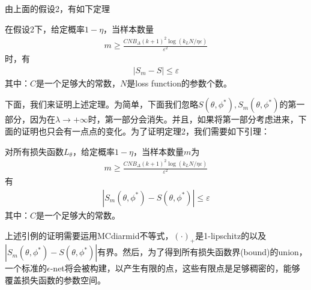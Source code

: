             \par
            由上面的假设2，有如下定理
            \begin{theorem}[2]
            在假设2下，给定概率$1-\eta$，当样本数量
            \begin{align*}
            m \geqslant \frac{CNB_\Delta(k+1)^2 \log(k_LN/\eta\varepsilon)}{\varepsilon^2}
            \end{align*}
            时，有
            \begin{align*}
            |S_m - S| \leqslant \varepsilon
            \end{align*}
            其中：$C$是一个足够大的常数，$N$是loss function的参数个数。
            \end{theorem}
            \par
            下面，我们来证明上述定理。为简单，下面我们忽略$S(\theta,\phi^*),S_m(\theta,\phi^*)$的第一部分，因为在$\lambda\to +\infty$时，第一部分会消失。并且，如果将第一部分考虑进来，下面的证明也只会有一点点的变化。为了证明定理2，我们需要如下引理：
            \begin{lemma}[6]
            \label{LS-GAN：引理6}
            对所有损失函数$L_\theta$，给定概率$1-\eta$，当样本数量$m$为
            \begin{align*}
            m \geqslant \frac{CNB_\Delta(k+1)^2 \log(k_LN/\eta\varepsilon)}{\varepsilon^2}
            \end{align*}
            有
            \begin{align*}
            |S_m(\theta,\phi^*) - S(\theta,\phi^*)| \leqslant \varepsilon
            \end{align*}
            其中：$C$是一个足够大的常数。
            \end{lemma}
            \par
            上述引例的证明需要运用MCdiarmid不等式，$(\cdot)_+$是1-lipschitz的以及$|S_m(\theta,\phi^*) - S(\theta,\phi^*)|$有界。然后，为了得到所有损失函数界(bound)的union，一个标准的$\epsilon$-net将会被构建，以产生有限的点，这些有限点是足够稠密的，能够覆盖损失函数的参数空间。
